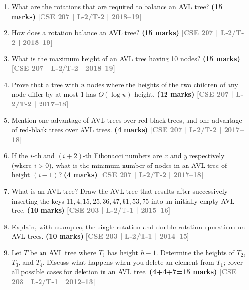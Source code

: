 \documentclass[12pt]{article}
\newcommand{\yr}[1]{\hfill\textcolor{gray}{\small\textbf{[#1]}}}
\newcommand{\mk}[1]{\textcolor{orange!70!black}{\small\textbf{(#1 marks)}}}
\begin{document}
\begin{enumerate}
  \item What are the rotations that are required to balance an AVL tree?
    \mk{15} \yr{CSE 207 | L-2/T-2 | 2018--19}


  \item How does a rotation balance an AVL tree?
    \mk{15} \yr{CSE 207 | L-2/T-2 | 2018--19}


  \item What is the maximum height of an AVL tree having 10 nodes?
    \mk{15} \yr{CSE 207 | L-2/T-2 | 2018--19}


  \item Prove that a tree with $n$ nodes where the heights of the two children of any node differ by at most 1 has $O(\log n)$ height. \mk{12}
    \yr{CSE 207 | L-2/T-2 | 2017--18}


  \item Mention one advantage of AVL trees over red-black trees, and one advantage of red-black trees over AVL trees. \mk{4}
    \yr{CSE 207 | L-2/T-2 | 2017--18}


  \item If the $i$-th and $(i+2)$-th Fibonacci numbers are $x$ and $y$ respectively (where $i > 0$), what is the minimum number of nodes in an AVL tree of height $(i-1)$? \mk{4}
    \yr{CSE 207 | L-2/T-2 | 2017--18}


  \item What is an AVL tree? Draw the AVL tree that results after successively inserting the keys $11, 4, 15, 25, 36, 47, 61, 53, 75$ into an initially empty AVL tree. \mk{10}
    \yr{CSE 203 | L-2/T-1 | 2015--16}


  \item Explain, with examples, the single rotation and double rotation operations on AVL trees. \mk{10}
    \yr{CSE 203 | L-2/T-1 | 2014--15}




\item Let $T$ be an AVL tree where $T_1$ has height $h-1$. Determine the heights of $T_2$, $T_3$, and $T_4$. Discuss what happens when you delete an element from $T_1$; cover all possible cases for deletion in an AVL tree. \mk{4+4+7=15}
\yr{CSE 203 | L-2/T-1 | 2012--13}

\begin{center}
\begin{tikzpicture}[
  tree node/.style={
    circle,
    draw,
    minimum size=7mm, %
    inner sep=0pt
  },
  subtree/.style={
    isosceles triangle,
    draw,
    shape border rotate=90,
    minimum width=8mm,
    minimum height=10mm,
    inner sep=0pt,
    anchor=apex
  },
  level distance=1.5cm,
  sibling distance=3.5cm
]


\end{tikzpicture}
\end{center}
\end{enumerate}
\end{document}
